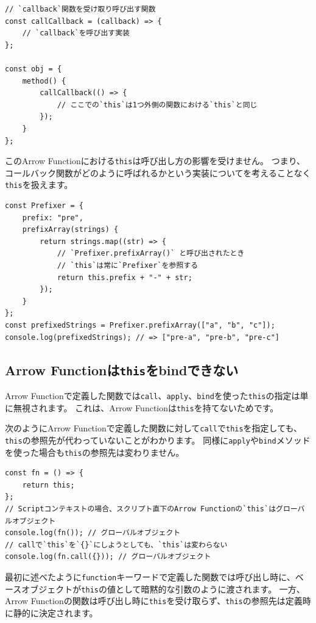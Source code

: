 \begin{lstlisting}
// `callback`関数を受け取り呼び出す関数
const callCallback = (callback) => {
    // `callback`を呼び出す実装
};

const obj = {
    method() {
        callCallback(() => {
            // ここでの`this`は1つ外側の関数における`this`と同じ
        });
    }
};
\end{lstlisting}

このArrow
Functionにおける\texttt{this}は呼び出し方の影響を受けません。
つまり、コールバック関数がどのように呼ばれるかという実装についてを考えることなく\texttt{this}を扱えます。

\begin{lstlisting}
const Prefixer = {
    prefix: "pre",
    prefixArray(strings) {
        return strings.map((str) => {
            // `Prefixer.prefixArray()` と呼び出されたとき
            // `this`は常に`Prefixer`を参照する
            return this.prefix + "-" + str;
        });
    }
};
const prefixedStrings = Prefixer.prefixArray(["a", "b", "c"]);
console.log(prefixedStrings); // => ["pre-a", "pre-b", "pre-c"]
\end{lstlisting}

\hypertarget{not-bind-arrow-function}{%
\subsection{\texorpdfstring{Arrow
Functionは\texttt{this}をbindできない}{Arrow Functionはthisをbindできない}}\label{not-bind-arrow-function}}

Arrow
Functionで定義した関数では\texttt{call}、\texttt{apply}、\texttt{bind}を使った\texttt{this}の指定は単に無視されます。
これは、Arrow
Functionは\texttt{this}を持てないためです。

次のようにArrow
Functionで定義した関数に対して\texttt{call}で\texttt{this}を指定しても、\texttt{this}の参照先が代わっていないことがわかります。
同様に\texttt{apply}や\texttt{bind}メソッドを使った場合も\texttt{this}の参照先は変わりません。

\begin{lstlisting}
const fn = () => {
    return this;
};
// Scriptコンテキストの場合、スクリプト直下のArrow Functionの`this`はグローバルオブジェクト
console.log(fn()); // グローバルオブジェクト
// callで`this`を`{}`にしようとしても、`this`は変わらない
console.log(fn.call({})); // グローバルオブジェクト
\end{lstlisting}

最初に述べたように\texttt{function}キーワードで定義した関数では呼び出し時に、ベースオブジェクトが\texttt{this}の値として暗黙的な引数のように渡されます。
一方、Arrow
Functionの関数は呼び出し時に\texttt{this}を受け取らず、\texttt{this}の参照先は定義時に静的に決定されます。

